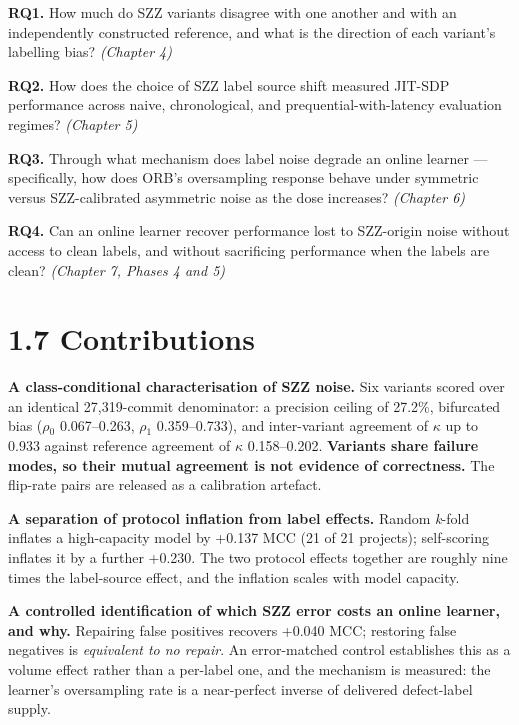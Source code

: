 \textbf{RQ1.} How much do SZZ variants disagree with one another and
with an independently constructed reference, and what is the direction
of each variant's labelling bias? \emph{(Chapter 4)}

\textbf{RQ2.} How does the choice of SZZ label source shift measured
JIT-SDP performance across naive, chronological, and
prequential-with-latency evaluation regimes? \emph{(Chapter 5)}

\textbf{RQ3.} Through what mechanism does label noise degrade an online
learner --- specifically, how does ORB's oversampling response behave
under symmetric versus SZZ-calibrated asymmetric noise as the dose
increases? \emph{(Chapter 6)}

\textbf{RQ4.} Can an online learner recover performance lost to
SZZ-origin noise without access to clean labels, and without sacrificing
performance when the labels are clean? \emph{(Chapter 7, Phases 4 and
5)}

\section{1.7 Contributions}\label{contributions}

\textbf{A class-conditional characterisation of SZZ noise.} Six variants
scored over an identical 27,319-commit denominator: a precision ceiling
of 27.2\%, bifurcated bias (\ensuremath{\rho}\ensuremath{_0} 0.067--0.263, \ensuremath{\rho}\ensuremath{_1} 0.359--0.733), and
inter-variant agreement of \ensuremath{\kappa} up to 0.933 against reference agreement of
\ensuremath{\kappa} 0.158--0.202. \textbf{Variants share failure modes, so their mutual
agreement is not evidence of correctness.} The flip-rate pairs are
released as a calibration artefact.

\textbf{A separation of protocol inflation from label effects.} Random
\emph{k}-fold inflates a high-capacity model by +0.137 MCC (21 of 21
projects); self-scoring inflates it by a further +0.230. The two
protocol effects together are roughly nine times the label-source
effect, and the inflation scales with model capacity.

\textbf{A controlled identification of which SZZ error costs an online
learner, and why.} Repairing false positives recovers +0.040 MCC;
restoring false negatives is \emph{equivalent to no repair}. An
error-matched control establishes this as a volume effect rather than a
per-label one, and the mechanism is measured: the learner's oversampling
rate is a near-perfect inverse of delivered defect-label supply.


